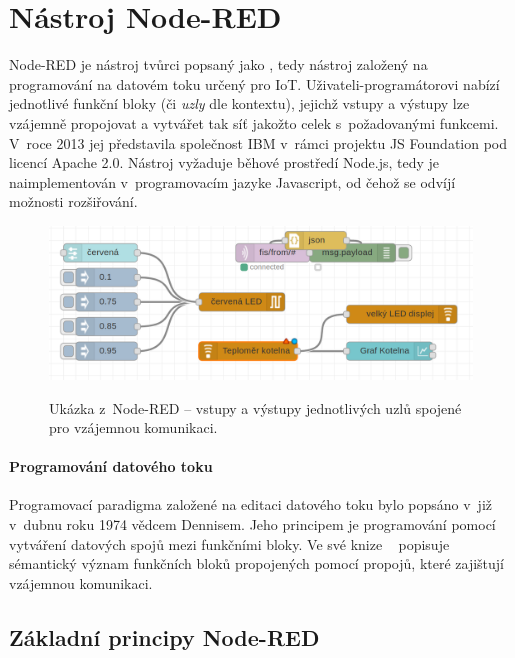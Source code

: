 \chapter{Nástroj Node-RED}
\label{ch:nastroj-node-red}

Node-RED je nástroj tvůrci popsaný jako , tedy nástroj založený na
programování na datovém toku určený pro IoT. Uživateli-programátorovi nabízí jednotlivé funkční bloky (či \emph{uzly} dle kontextu),
jejichž vstupy a výstupy lze vzájemně propojovat a vytvářet tak síť jakožto celek s~požadovanými funkcemi.
V~roce 2013 jej představila společnost IBM v~rámci projektu JS Foundation pod licencí Apache 2.0. Nástroj vyžaduje
běhové prostředí Node.js, tedy je naimplementován v~programovacím jazyke Javascript, od čehož se odvíjí možnosti
rozšiřování.

\begin{figure}
    \includegraphics[width=\textwidth]{figures/node-red-example.png}
    \label{fig:node-red-example}
    \caption{Ukázka z~Node-RED -- vstupy a výstupy jednotlivých uzlů spojené pro vzájemnou komunikaci.}
\end{figure}

\subsubsection{Programování datového toku}
Programovací paradigma založené na editaci datového toku bylo popsáno v~již v~dubnu roku 1974 vědcem Dennisem. Jeho
principem je programování pomocí vytváření datových spojů mezi funkčními bloky.
Ve své knize ~\cite{FirstVersionOfDataflow} popisuje sémantický
význam funkčních bloků propojených pomocí propojů, které zajištují vzájemnou komunikaci. 

\section{Základní principy Node-RED}\label{sec:zakladni-principy-node-red}

